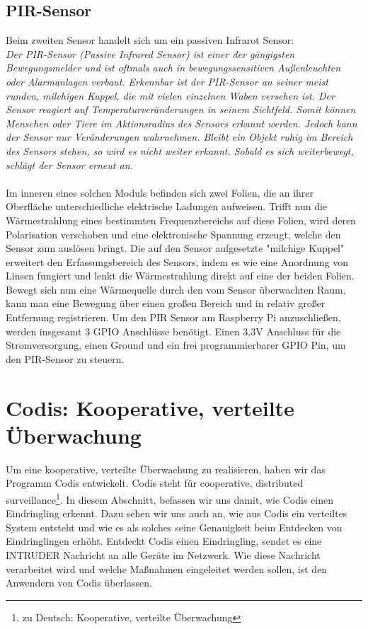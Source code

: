 \documentclass[journal]{IEEEtran}
\begin{document}
\subsection{PIR-Sensor}
Beim zweiten Sensor handelt sich um ein passiven Infrarot Sensor:\\ \textit{Der PIR-Sensor (Passive Infrared Sensor) ist einer der gängigsten Bewegungsmelder und ist oftmals auch in bewegungssensitiven Außenleuchten oder Alarmanlagen verbaut. Erkennbar ist der PIR-Sensor an seiner meist runden, milchigen Kuppel, die mit vielen einzelnen Waben versehen ist. Der Sensor reagiert auf Temperaturveränderungen in seinem Sichtfeld. Somit können Menschen oder Tiere im Aktionsradius des Sensors erkannt werden. Jedoch kann der Sensor nur Veränderungen wahrnehmen. Bleibt ein Objekt ruhig im Bereich des Sensors stehen, so wird es nicht weiter erkannt.  Sobald es sich weiterbewegt, schlägt der Sensor erneut an.}\cite[S. 493]{Raspi}\\ \\ Im inneren eines solchen Moduls befinden sich zwei Folien, die an ihrer Oberfläche unterschiedliche elektrische Ladungen aufweisen. Trifft nun die Wärmestrahlung eines bestimmten Frequenzbereichs auf diese Folien, wird deren Polarisation verschoben und eine elektronische Spannung erzeugt, welche den Sensor zum auslösen bringt. Die auf den Sensor aufgesetzte "milchige Kuppel" erweitert den Erfassungsbereich des Sensors, indem es wie eine Anordnung von Linsen fungiert und lenkt die Wärmestrahlung direkt auf eine der beiden Folien. Bewegt sich nun eine Wärmequelle durch den vom Sensor überwachten Raum, kann man eine Bewegung über einen großen Bereich und in relativ großer Entfernung registrieren.\cite{pir} Um den PIR Sensor am Raspberry Pi anzuschließen, werden insgesamt 3 GPIO Anschlüsse benötigt. Einen 3,3V Anschluss für die Stromversorgung, einen Ground und ein frei programmierbarer GPIO Pin, um den PIR-Sensor zu steuern.


\section{Codis: Kooperative, verteilte Überwachung}

Um eine kooperative, verteilte Überwachung zu realisieren, haben wir das Programm Codis entwickelt. Codis steht für cooperative, distributed surveillance\footnote{zu Deutsch: Kooperative, verteilte Überwachung}. In diesem Abschnitt, befassen wir uns damit, wie Codis einen Eindringling erkennt. Dazu sehen wir uns auch an, wie aus Codis ein verteiltes System entsteht und wie es als solches seine Genauigkeit beim Entdecken von Eindringlingen erhöht. Entdeckt Codis einen Eindringling, sendet es eine \MakeUppercase{INTRUDER} Nachricht an alle Geräte im Netzwerk. Wie diese Nachricht verarbeitet wird und welche Maßnahmen eingeleitet werden sollen, ist den Anwendern von Codis überlassen.
\end{document}
